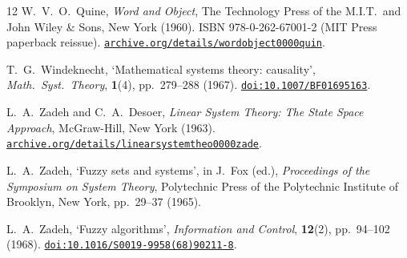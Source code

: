 \documentclass[10pt,a4paper,twocolumn]{article}
\begin{document}
\begin{thebibliography}{12}
W.~V.~O.~Quine, \emph{Word and Object}, The Technology Press of the
M.I.T.\ and John Wiley \& Sons, New York (1960).
ISBN 978-0-262-67001-2 (MIT Press paperback reissue).
\href{https://archive.org/details/wordobject0000quin}%
     {\nolinkurl{archive.org/details/wordobject0000quin}}.

T.~G.~Windeknecht, `Mathematical systems theory: causality',
\emph{Math.\ Syst.\ Theory}, \textbf{1}(4), pp.~279--288 (1967).
\href{https://doi.org/10.1007/BF01695163}%
     {\nolinkurl{doi:10.1007/BF01695163}}.

L.~A.~Zadeh and C.~A.~Desoer, \emph{Linear System Theory: The State
Space Approach}, McGraw-Hill, New York (1963).
\href{https://archive.org/details/linearsystemtheo0000zade}%
     {\nolinkurl{archive.org/details/linearsystemtheo0000zade}}.

L.~A.~Zadeh, `Fuzzy sets and systems',
in J.~Fox (ed.), \emph{Proceedings of the Symposium on System Theory},
Polytechnic Press of the Polytechnic Institute of Brooklyn, New York,
pp.~29--37 (1965).

L.~A.~Zadeh, `Fuzzy algorithms',
\emph{Information and Control}, \textbf{12}(2), pp.~94--102 (1968).
\href{https://doi.org/10.1016/S0019-9958(68)90211-8}%
     {\nolinkurl{doi:10.1016/S0019-9958(68)90211-8}}.

\end{thebibliography}
\end{document}
